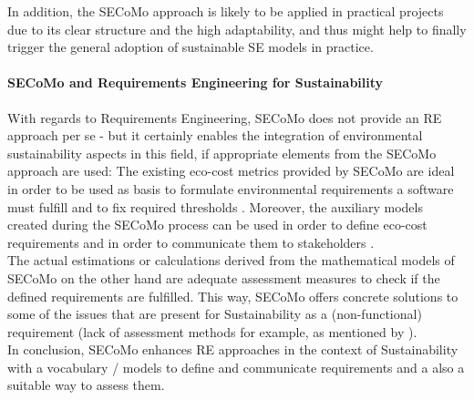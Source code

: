 \documentclass[oribibl]{llncs}
\begin{document}
In addition, the SECoMo approach is likely to be applied in practical projects due to its clear structure and the high adaptability, and thus might help to finally trigger the general adoption of sustainable SE models in practice.


\paragraph{SECoMo and Requirements Engineering for Sustainability}
With regards to Requirements Engineering, SECoMo does not provide an RE approach per se - but it certainly enables the integration of environmental sustainability aspects in this field, if appropriate elements from the SECoMo approach are used: The existing eco-cost metrics provided by SECoMo are ideal in order to be used as basis to formulate environmental requirements a software must fulfill and to fix required thresholds \cite{schulze_cost_2016}. Moreover, the auxiliary models created during the SECoMo process can be used in order to define eco-cost requirements and in order to communicate them to stakeholders \cite{schulze_cost_2016}.\\
The actual estimations or calculations derived from the mathematical models of SECoMo on the other hand are adequate assessment measures to check if the defined requirements are fulfilled. This way, SECoMo offers concrete solutions to some of the issues that are present for Sustainability as a (non-functional) requirement (lack of assessment methods for example, as mentioned by \cite{penzenstadler_safety_2014}).\\ %
In conclusion, SECoMo enhances RE approaches in the context of Sustainability with a vocabulary / models to define and communicate requirements and a also a suitable way to assess them.
\end{document}
